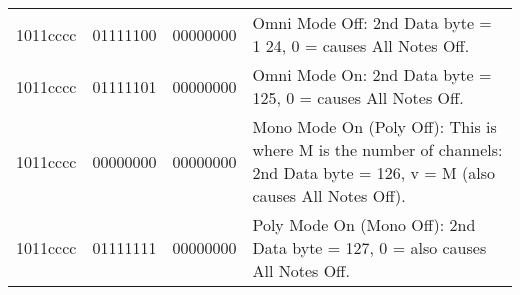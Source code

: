 \begin{center}
\begin{supertabular}{| C{2cm} | C{2cm} | C{2.3cm} | C{8cm} |}
             1011cccc & 01111100 & 00000000 & Omni Mode Off: 2nd Data byte = 1 24, 0 = causes All Notes Off. \\
                1011cccc & 01111101 & 00000000 & Omni Mode On: 2nd Data byte = 125, 0 = causes All Notes Off. \\
             1011cccc & 00000000 & 00000000 & Mono Mode On (Poly Off): This is where M is the number of channels: 2nd Data byte = 126, v = M (also causes All Notes Off). \\
                1011cccc & 01111111 & 00000000 & Poly Mode On (Mono Off): 2nd Data byte = 127, 0 = also causes All Notes Off.

 \\
        \end{supertabular}
        \end{center}


